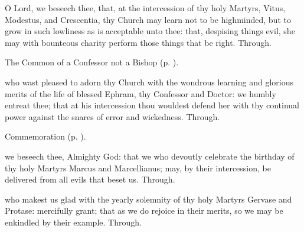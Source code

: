 
\memorialCollect
{} O Lord, we beseech thee, that, at the intercession of thy holy Martyrs, Vitus, Modestus, and Crescentia, thy Church may learn not to be highminded, but to grow in such lowliness as is acceptable unto thee: that, despising things evil, she may with bounteous charity perform those things that be right. Through.



\begin{rubric}
	The Common of a Confessor not a Bishop (p. \pageref{CommonConfessorNotBishop}).
\end{rubric}

{} who wast pleased to adorn thy Church with the wondrous learning and glorious merits of the life of blessed Ephram, thy Confessor and Doctor: we humbly entreat thee; that at his intercession thou wouldest defend her with thy continual power against the snares of error and wickedness. Through.

\begin{rubric}
	Commemoration  (p. \pageref{MarcusMarcellianusCollect}).
\end{rubric}



\memorialCollect\label{MarcusMarcellianusCollect}
 we beseech thee, Almighty God: that we who devoutly celebrate the birthday of thy holy Martyrs Marcus and Marcellianus; may, by their intercession, be delivered from all evils that beset us. Through.


\clearpage
{}

\memorialCollect
{} who makest us glad with the yearly solemnity of thy holy Martyrs Gervase and Protase: mercifully grant; that as we do rejoice in their merits, so we may be enkindled by their example. Through.




